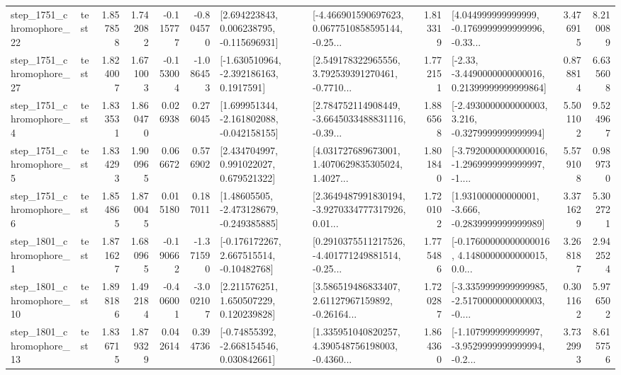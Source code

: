 \begin{tabular}{llrrrrllrlrr}
 step\_1751\_chromophore\_22 &      test &      1.857858 &    1.742082 &     -0.115777 & -0.804570 &    [2.694223843, 0.006238795, -0.115696931] &  [-4.466901590697623, 0.0677510858595144, -0.25... &       1.813319 &  [4.044999999999999, -0.1769999999999996, -0.33... &            3.476915 &          8.210089 \\
 step\_1751\_chromophore\_27 &      test &      1.824007 &    1.671003 &     -0.153004 & -1.086453 &     [-1.630510964, -2.392186163, 0.1917591] &  [2.549178322965556, 3.792539391270461, -0.7710... &       1.772151 &  [-2.33, -3.4490000000000016, 0.21399999999999864] &            0.878814 &          6.635608 \\
  step\_1751\_chromophore\_4 &      test &      1.833531 &    1.860470 &      0.026938 &  0.276045 &   [1.699951344, -2.161802088, -0.042158155] &  [2.784752114908449, -3.6645033488831116, -0.39... &       1.886568 &  [-2.4930000000000003, 3.216, -0.3279999999999994] &            5.501102 &          9.524967 \\
  step\_1751\_chromophore\_5 &      test &      1.834293 &    1.900965 &      0.066672 &  0.576902 &     [2.434704997, 0.991022027, 0.679521322] &  [4.031727689673001, 1.4070629835305024, 1.4027... &       1.801840 &  [-3.7920000000000016, -1.2969999999999997, -1.... &            5.579108 &          0.989730 \\
  step\_1751\_chromophore\_6 &      test &      1.854865 &    1.870045 &      0.015180 &  0.187011 &    [1.48605505, -2.473128679, -0.249385885] &  [2.3649487991830194, -3.9270334777317926, 0.01... &       1.720102 &   [1.931000000000001, -3.666, -0.2839999999999989] &            3.371629 &          5.302721 \\
  step\_1801\_chromophore\_1 &      test &      1.871627 &    1.680965 &     -0.190662 & -1.371590 &    [-0.176172267, 2.667515514, -0.10482768] &  [0.2910375511217526, -4.401771249881514, -0.25... &       1.775486 &  [-0.17600000000000016, 4.1480000000000015, 0.0... &            3.268187 &          2.942524 \\
 step\_1801\_chromophore\_10 &      test &      1.898186 &    1.492184 &     -0.406001 & -3.002107 &     [2.211576251, 1.650507229, 0.120239828] &  [3.586519486833407, 2.61127967159892, -0.26164... &       1.720287 &  [-3.3359999999999985, -2.5170000000000003, -0.... &            0.301162 &          5.976502 \\
 step\_1801\_chromophore\_13 &      test &      1.836715 &    1.879329 &      0.042614 &  0.394736 &    [-0.74855392, -2.668154546, 0.030842661] &  [1.335951040820257, 4.390548756198003, -0.4360... &       1.864360 &  [-1.107999999999997, -3.9529999999999994, -0.2... &            3.732993 &          8.615756 \\

\end{tabular}
